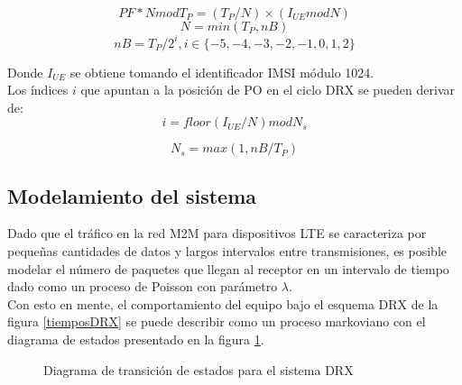 \documentclass[journal]{IEEEtran}
\begin{document}
\begin{equation}
PF*NmodT_{P}=(T_{P}/N)\times(I_{UE}modN)
\end{equation}
\begin{equation}
N=min(T_{P},nB)
\end{equation}
\begin{equation}
nB = T_{P}/2^i, i\in \lbrace-5,-4,-3,-2,-1,0,1,2\rbrace
\end{equation}

Donde $I_{UE}$ se obtiene tomando el identificador IMSI módulo 1024.\\

Los índices $i$ que apuntan a la posición de PO en el ciclo DRX se pueden derivar de:\\

\begin{equation}
i = floor(I_{UE}/N)modN_{s}
\end{equation}

\begin{equation}
N_{s} = max(1,nB/T_{P})
\end{equation}

\subsection{Modelamiento del sistema}

Dado que el tráfico en la red M2M para dispositivos LTE se caracteriza por pequeñas cantidades de datos y largos intervalos entre transmisiones, es posible modelar el número de paquetes que llegan al receptor en un intervalo de tiempo dado como un proceso de Poisson con parámetro $\lambda$.\\

Con esto en mente, el comportamiento del equipo bajo el esquema DRX de la figura \ref{tiemposDRX} se puede describir como un proceso markoviano con el diagrama de estados presentado en la figura \ref{estadosDRX}.

\begin{figure}[h]
\centering
{}
\caption{Diagrama de transición de estados para el sistema DRX}
\label{estadosDRX}
\end{figure}
\end{document}
